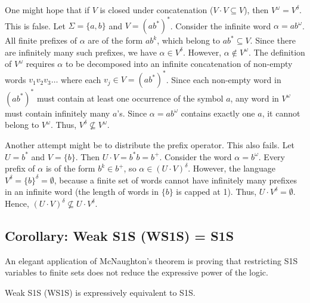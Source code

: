 \begin{formaldetails}
One might hope that if $V$ is closed under concatenation ($V \cdot V \subseteq V$), then $V^\omega = V^\delta$. This is false.
Let $\Sigma = \{a, b\}$ and $V = (a b^*)^*$.
Consider the infinite word $\alpha = a b^\omega$.
All finite prefixes of $\alpha$ are of the form $a b^k$, which belong to $a b^* \subseteq V$. Since there are infinitely many such prefixes, we have $\alpha \in V^\delta$.
However, $\alpha \notin V^\omega$. The definition of $V^\omega$ requires $\alpha$ to be decomposed into an infinite concatenation of non-empty words $v_1 v_2 v_3 \dots$ where each $v_j \in V = (a b^*)^*$. Since each non-empty word in $(a b^*)^*$ must contain at least one occurrence of the symbol $a$, any word in $V^\omega$ must contain infinitely many $a$'s. Since $\alpha = a b^\omega$ contains exactly one $a$, it cannot belong to $V^\omega$.
Thus, $V^\delta \not\subseteq V^\omega$.
\end{formaldetails}

\begin{formaldetails}
Another attempt might be to distribute the prefix operator. This also fails.
Let $U = b^*$ and $V = \{b\}$. Then $U \cdot V = b^* b = b^+$.
Consider the word $\alpha = b^\omega$.
Every prefix of $\alpha$ is of the form $b^k \in b^+$, so $\alpha \in (U \cdot V)^\delta$.
However, the language $V^\delta = \{b\}^\delta = \emptyset$, because a finite set of words cannot have infinitely many prefixes in an infinite word (the length of words in $\{b\}$ is capped at 1). Thus, $U \cdot V^\delta = \emptyset$.
Hence, $(U \cdot V)^\delta \not\subseteq U \cdot V^\delta$.
\end{formaldetails}

\subsection{Corollary: Weak S1S (WS1S) = S1S}
\label{subsec:ws1s-s1s}

An elegant application of McNaughton's theorem is proving that restricting S1S variables to finite sets does not reduce the expressive power of the logic.

\begin{theorem}
Weak S1S (WS1S) is expressively equivalent to S1S.
\end{theorem}

